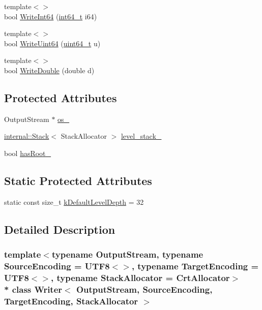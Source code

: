 \begin{DoxyCompactItemize}
\item 
{\footnotesize template$<$$>$ }\\bool \hyperlink{classWriter_a3528a42394d50f3b92659de517433c85}{Write\+Int64} (\hyperlink{stdint_8h_a414156feea104f8f75b4ed9e3121b2f6}{int64\+\_\+t} i64)
\item 
{\footnotesize template$<$$>$ }\\bool \hyperlink{classWriter_a025b3d2ca07d539a7067575e95f5578d}{Write\+Uint64} (\hyperlink{stdint_8h_aec6fcb673ff035718c238c8c9d544c47}{uint64\+\_\+t} u)
\item 
{\footnotesize template$<$$>$ }\\bool \hyperlink{classWriter_af317e1d24249b8c68503a6253c703bd2}{Write\+Double} (double d)
\end{DoxyCompactItemize}
\subsection*{Protected Attributes}
\begin{DoxyCompactItemize}
\item 
Output\+Stream $\ast$ \hyperlink{classWriter_a51ba99f008df7bbf32de311aa22b05ae}{os\+\_\+}
\item 
\hyperlink{classinternal_1_1Stack}{internal\+::\+Stack}$<$ Stack\+Allocator $>$ \hyperlink{classWriter_af179a9f272f80414d48f64ede9ddde12}{level\+\_\+stack\+\_\+}
\item 
bool \hyperlink{classWriter_af252ff409093ea786d5efce0d08d3804}{has\+Root\+\_\+}
\end{DoxyCompactItemize}
\subsection*{Static Protected Attributes}
\begin{DoxyCompactItemize}
\item 
static const size\+\_\+t \hyperlink{classWriter_aad47efc97708b2a64e4a0994cbbfae25}{k\+Default\+Level\+Depth} = 32
\end{DoxyCompactItemize}


\subsection{Detailed Description}
\subsubsection*{template$<$typename Output\+Stream, typename Source\+Encoding = U\+T\+F8$<$$>$, typename Target\+Encoding = U\+T\+F8$<$$>$, typename Stack\+Allocator = Crt\+Allocator$>$\\*
class Writer$<$ Output\+Stream, Source\+Encoding, Target\+Encoding, Stack\+Allocator $>$}

